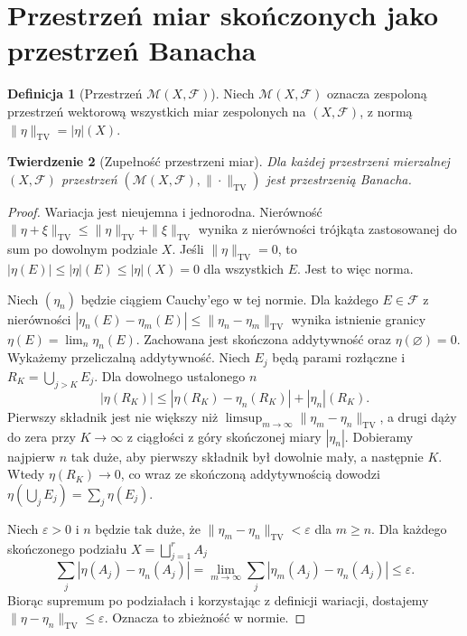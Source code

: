 \documentclass[11pt,a4paper,oneside]{book}
\numberwithin{equation}{chapter}
\theoremstyle{plain}
\newtheorem{twierdzenie}{Twierdzenie}[chapter]
\theoremstyle{definition}
\newtheorem{definicja}[twierdzenie]{Definicja}
\theoremstyle{remark}
\begin{document}
\section{Przestrzeń miar skończonych jako przestrzeń Banacha}
\begin{definicja}[Przestrzeń $\mathcal M(X,\mathcal F)$]
\label{def:complex-measures-space-16}
Niech $\mathcal M(X,\mathcal F)$ oznacza zespoloną
przestrzeń wektorową wszystkich miar zespolonych
na $(X,\mathcal F)$, z normą
$\|\eta\|_{\mathrm{TV}}=|\eta|(X)$.
\end{definicja}

\begin{twierdzenie}[Zupełność przestrzeni miar]
\label{thm:complete-measures-16}
Dla każdej przestrzeni mierzalnej $(X,\mathcal F)$
przestrzeń $(\mathcal M(X,\mathcal F),\|\cdot\|_{\mathrm{TV}})$
jest przestrzenią Banacha.
\end{twierdzenie}
\begin{proof}
Wariacja jest nieujemna i jednorodna. Nierówność
$\|\eta+\xi\|_{\mathrm{TV}}\le\|\eta\|_{\mathrm{TV}}+
\|\xi\|_{\mathrm{TV}}$ wynika z nierówności trójkąta
zastosowanej do sum po dowolnym podziale $X$.
Jeśli $\|\eta\|_{\mathrm{TV}}=0$, to
$|\eta(E)|\le|\eta|(E)\le|\eta|(X)=0$ dla wszystkich $E$.
Jest to więc norma.

Niech $(\eta_n)$ będzie ciągiem Cauchy'ego w tej normie.
Dla każdego $E\in\mathcal F$ z nierówności
$|\eta_n(E)-\eta_m(E)|\le\|\eta_n-\eta_m\|_{\mathrm{TV}}$
wynika istnienie granicy $\eta(E)=\lim_n\eta_n(E)$.
Zachowana jest skończona addytywność oraz
$\eta(\varnothing)=0$. Wykażemy przeliczalną addytywność.
Niech $E_j$ będą parami rozłączne i
$R_K=\bigcup_{j>K}E_j$. Dla dowolnego ustalonego $n$
\[
|\eta(R_K)|\le|\eta(R_K)-\eta_n(R_K)|+|\eta_n|(R_K).
\]
Pierwszy składnik jest nie większy niż
$\limsup_{m\to\infty}\|\eta_m-\eta_n\|_{\mathrm{TV}}$,
a drugi dąży do zera przy $K\to\infty$ z ciągłości
z góry skończonej miary $|\eta_n|$. Dobieramy najpierw
$n$ tak duże, aby pierwszy składnik był dowolnie mały,
a następnie $K$. Wtedy $\eta(R_K)\to0$,
co wraz ze skończoną addytywnością dowodzi
$\eta(\bigcup_jE_j)=\sum_j\eta(E_j)$.

Niech $\varepsilon>0$ i $n$ będzie tak duże, że
$\|\eta_m-\eta_n\|_{\mathrm{TV}}<\varepsilon$ dla $m\ge n$.
Dla każdego skończonego podziału $X=\bigsqcup_{j=1}^rA_j$
\[
\sum_j|\eta(A_j)-\eta_n(A_j)|
=\lim_{m\to\infty}\sum_j|\eta_m(A_j)-\eta_n(A_j)|
\le\varepsilon.
\]
Biorąc supremum po podziałach i korzystając z definicji
wariacji, dostajemy $\|\eta-\eta_n\|_{\mathrm{TV}}
\le\varepsilon$. Oznacza to zbieżność w normie.
\end{proof}
\end{document}
